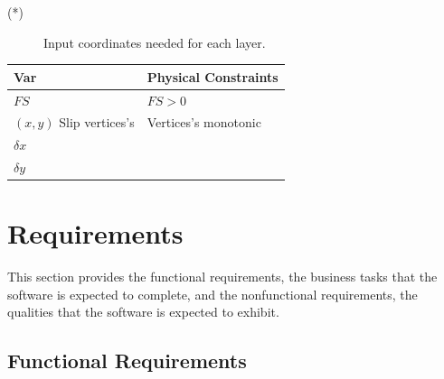 \documentclass[12pt]{article}
\renewcommand{\arraystretch}{1}
\begin{document}
\noindent \begin{description}
\item[(*)] Input coordinates needed for each layer.
\end{description}

\renewcommand{\arraystretch}{1.2} 
\noindent \begin{longtable}{l l} 
  \toprule \label{TblOutputVar}
  \textbf{Var} & \textbf{Physical Constraints} \\
  \midrule 
  $FS$ & $FS>0$ \\
  $(x,y)$ Slip vertices's &  Vertices's monotonic \\
  $\delta x$ &  \\
  $\delta y$ &  \\
  \bottomrule
\end{longtable}

\section{Requirements}

This section provides the functional requirements, the business tasks
that the software is expected to complete, and the nonfunctional
requirements, the qualities that the software is expected to exhibit.

\subsection{Functional Requirements}
\end{document}
